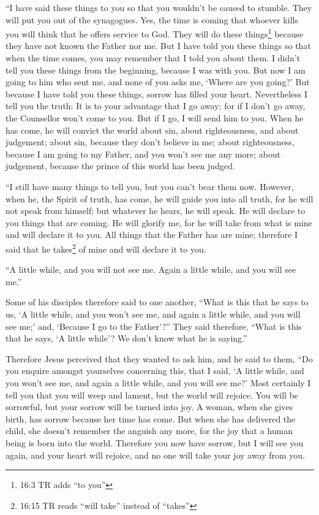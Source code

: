  ``I have said these things to you so that you wouldn't be
caused to stumble.  They will put you out of the synagogues.
Yes, the time is coming that whoever kills you will think that he offers
service to God.  They will do these things\footnote{16:3 TR
  adds ``to you''} because they have not known the Father nor me.
 But I have told you these things so that when the time
comes, you may remember that I told you about them. I didn't tell you
these things from the beginning, because I was with you. 
But now I am going to him who sent me, and none of you asks me, `Where
are you going?'  But because I have told you these things,
sorrow has filled your heart.  Nevertheless I tell you the
truth: It is to your advantage that I go away; for if I don't go away,
the Counsellor won't come to you. But if I go, I will send him to you.
 When he has come, he will convict the world about sin,
about righteousness, and about judgement;  about sin,
because they don't believe in me;  about righteousness,
because I am going to my Father, and you won't see me any more;
 about judgement, because the prince of this world has been
judged.

 ``I still have many things to tell you, but you can't bear
them now.  However, when he, the Spirit of truth, has come,
he will guide you into all truth, for he will not speak from himself;
but whatever he hears, he will speak. He will declare to you things that
are coming.  He will glorify me, for he will take from what
is mine and will declare it to you.  All things that the
Father has are mine; therefore I said that he takes\footnote{16:15 TR
  reads ``will take'' instead of ``takes''} of mine and will declare it
to you.

 ``A little while, and you will not see me. Again a little
while, and you will see me.''

 Some of his disciples therefore said to one another,
``What is this that he says to us, `A little while, and you won't see
me, and again a little while, and you will see me;' and, `Because I go
to the Father'?''  They said therefore, ``What is this that
he says, `A little while'? We don't know what he is saying.''

 Therefore Jesus perceived that they wanted to ask him, and
he said to them, ``Do you enquire amongst yourselves concerning this,
that I said, `A little while, and you won't see me, and again a little
while, and you will see me?'  Most certainly I tell you
that you will weep and lament, but the world will rejoice. You will be
sorrowful, but your sorrow will be turned into joy.  A
woman, when she gives birth, has sorrow because her time has come. But
when she has delivered the child, she doesn't remember the anguish any
more, for the joy that a human being is born into the world.
 Therefore you now have sorrow, but I will see you again,
and your heart will rejoice, and no one will take your joy away from
you.

